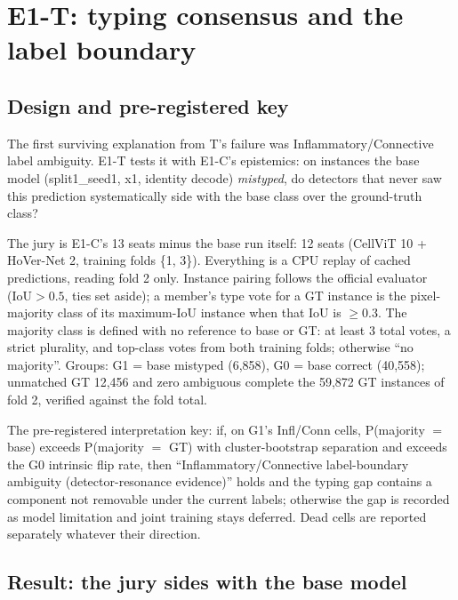 \documentclass[11pt,a4paper]{article}
\begin{document}
\section{E1-T: typing consensus and the label boundary}\label{sec:e1t}

\subsection{Design and pre-registered key}

The first surviving explanation from T's failure was Inflammatory/Connective label ambiguity. E1-T\cite{specs} tests it with E1-C's epistemics: on instances the base model (split1\_seed1, x1, identity decode) \emph{mistyped}, do detectors that never saw this prediction systematically side with the base class over the ground-truth class?

The jury is E1-C's 13 seats minus the base run itself: 12 seats (CellViT 10 + HoVer-Net 2, training folds \{1, 3\}). Everything is a CPU replay of cached predictions, reading fold 2 only. Instance pairing follows the official evaluator (IoU$>0.5$, ties set aside); a member's type vote for a GT instance is the pixel-majority class of its maximum-IoU instance when that IoU is $\geq0.3$. The majority class is defined with no reference to base or GT: at least 3 total votes, a strict plurality, and top-class votes from both training folds; otherwise ``no majority''. Groups: G1 = base mistyped (6,858), G0 = base correct (40,558); unmatched GT 12,456 and zero ambiguous complete the 59,872 GT instances of fold 2, verified against the fold total.

The pre-registered interpretation key: if, on G1's Infl/Conn cells, P(majority $=$ base) exceeds P(majority $=$ GT) with cluster-bootstrap separation and exceeds the G0 intrinsic flip rate, then ``Inflammatory/Connective label-boundary ambiguity (detector-resonance evidence)'' holds and the typing gap contains a component not removable under the current labels; otherwise the gap is recorded as model limitation and joint training stays deferred. Dead cells are reported separately whatever their direction.

\subsection{Result: the jury sides with the base model}
\end{document}

